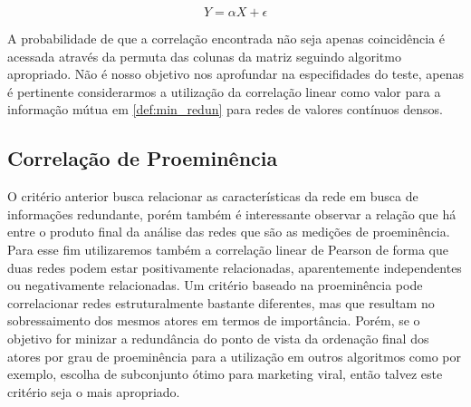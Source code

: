 \documentclass{article}
\begin{document}
\begin{equation}
\label{def:linear_model_qap}
Y = \alpha X + \epsilon
\end{equation}

A probabilidade de que a correlação encontrada não seja apenas coincidência é
acessada através da permuta das colunas da matriz seguindo algoritmo apropriado.
Não é nosso objetivo nos aprofundar na especifidades do teste, apenas é pertinente
considerarmos a  utilização da correlação linear como valor para a informação
mútua em \ref{def:min_redun} para redes de valores contínuos densos.

\subsection{Correlação de Proeminência}

O critério anterior busca relacionar as características da rede em busca de
informações redundante, porém também é interessante observar a relação que há
entre o produto final da análise das redes que são as medições de proeminência.
Para esse fim utilizaremos também a correlação linear de Pearson de forma que
duas redes podem estar positivamente relacionadas, aparentemente independentes
ou negativamente relacionadas. Um critério baseado na proeminência pode
correlacionar redes estruturalmente bastante diferentes, mas que resultam no
sobressaimento dos mesmos atores em termos de importância. Porém, se o objetivo
for minizar a redundância do ponto de vista da ordenação final dos atores por
grau de proeminência para a utilização em outros algoritmos como por exemplo,
escolha de subconjunto ótimo para marketing viral, então talvez este critério
seja o mais apropriado.
\end{document}
